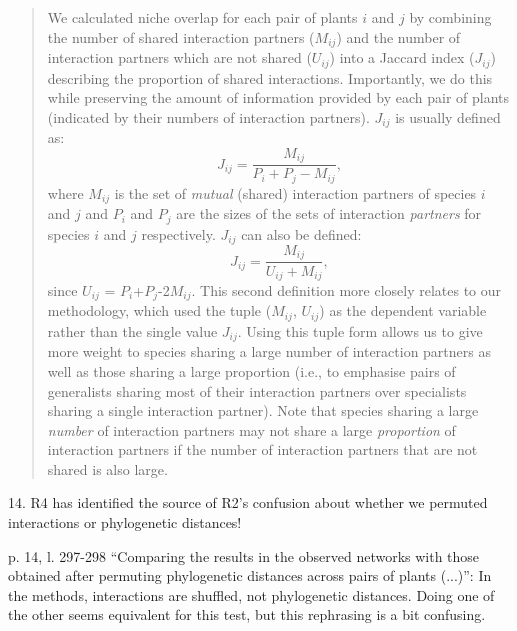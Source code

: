 \documentclass[12pt]{letter}
\newenvironment{refquote}{\bigskip \begin{it}}{\end{it}\smallskip}
\begin{document}
	\begin{quotation}
	    We calculated niche overlap for each pair of plants $i$ and $j$ by 
	    combining the number of shared interaction
	    partners ($M_{ij}$) and the number of interaction partners which are not
	    shared ($U_{ij}$) into a Jaccard index ($J_{ij}$) describing 
	    the proportion of shared interactions. Importantly, we do this while 
	    preserving the amount of information provided by each pair of plants
	    (indicated by their numbers of interaction partners). $J_{ij}$ is usually defined as: 
	    \begin{equation}
	      J_{ij} = \frac{M_{ij}}{P_i+P_j-M_{ij}} ,
	    \end{equation}
	    where $M_{ij}$ is the set of \emph{mutual} (shared) interaction partners of 
	    species $i$ and $j$ and $P_i$ and $P_j$ are the sizes of the sets of interaction 
	    \emph{partners} for species $i$ and $j$ respectively. $J_{ij}$ can also be defined:
	    \begin{equation}
	      J_{ij} = \frac{M_{ij}}{U_{ij}+M_{ij}} ,
	    \end{equation}
	    since $U_{ij}$ = $P_{i}$+$P_{j}$-2$M_{ij}$. This second definition more closely
	    relates to our methodology, which used the tuple ($M_{ij}$, $U_{ij}$) as the
	    dependent variable rather than the single value $J_{ij}$. Using this tuple form
	    allows us to give more 
	    weight to species sharing a large number of interaction partners as well as 
	    those sharing a large proportion (i.e., to emphasise pairs of generalists 
	    sharing most of their interaction partners over specialists sharing a single 
	    interaction partner). Note that species sharing a large \emph{number} of interaction partners may not share a large \emph{proportion} of interaction partners if the number of interaction partners that are not shared is also large. %
	    \end{quotation}


14. R4 has identified the source of R2's confusion about whether we permuted interactions or phylogenetic distances!
	
	\begin{refquote}
		p. 14, l. 297-298 “Comparing the results in the observed networks with those obtained after permuting phylogenetic distances across pairs of plants (...)”: In the methods, interactions are shuffled, not phylogenetic distances. Doing one of the other seems equivalent for this test, but this rephrasing is a bit confusing.
	\end{refquote}
\end{document}
